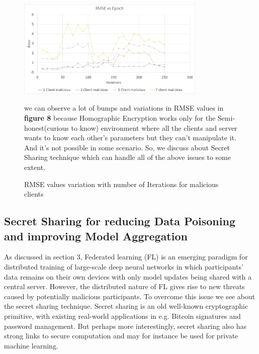 \documentclass[conference]{IEEEtran}
\begin{document}
\begin{figure}

\vspace{\baselineskip}

\includegraphics[width=90mm,scale=0.7]{RMSE_Malicious_HE.jpeg}
\caption{ RMSE  values  variation  with  number  of  Iterations for malicious clients}

\vspace{\baselineskip}

we can observe a lot of bumps and variations in RMSE values in \textbf{figure 8} because Homographic Encryption works only for the Semi-honest(curious to know) environment where all the clients and server wants to know each other's parameters but they can't manipulate it. And it's not possible in some scenario. So, we discuss about Secret Sharing technique which can handle all of the above issues to some extent. 

\end{figure}


\subsection{Secret Sharing for reducing Data Poisoning and improving Model Aggregation}
As discussed in section 3, Federated learning (FL) is an emerging paradigm for distributed training of large-scale deep neural networks in which participants’ data remains on their own devices with only model updates being shared with a central server. However, the distributed nature of FL gives rise to new threats caused by potentially malicious participants.
To overcome this issue we see about the secret sharing technique. 
Secret sharing is an old well-known cryptographic primitive, with existing real-world applications in e.g. Bitcoin signatures and password management. But perhaps more interestingly, secret sharing also has strong links to secure computation and may for instance be used for private machine learning. 

\vspace{\baselineskip}
\end{document}
